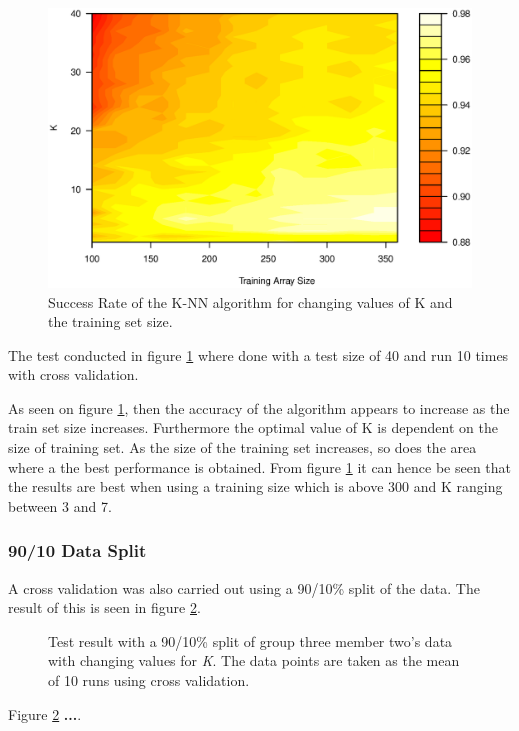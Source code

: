 \begin{figure}[H]
\centering
\includegraphics[width = 15cm]{graphics/graph_G3M2_20}
\caption{Success Rate of the K-NN algorithm for changing values of K and the training set size.}
\label{fig:personDependent_contour}
\end{figure}

The test conducted in figure \ref{fig:personDependent_contour} where done with a test size of 40 and run 10 times with cross validation.

As seen on figure \ref{fig:personDependent_contour}, then the accuracy of the algorithm appears to increase as the train set size increases.
Furthermore the optimal value of K is dependent on the size of training set. 
As the size of the training set increases, so does the area where a the best performance is obtained.
From figure \ref{fig:personDependent_contour} it can hence be seen that the results are best when using a training size which is above 300 and K ranging between 3 and 7.


\subsubsection{90/10 Data Split}
A cross validation was also carried out using a 90/10\% split of the data. 
The result of this is seen in figure \ref{fig:PersonDependent_9010}.


\begin{figure}[H]
\centering
\caption{Test result with a 90/10\% split of group three member two's data with changing values for \textit{K}. The data points are taken as the mean of 10 runs using cross validation.}
\label{fig:PersonDependent_9010}
\end{figure}

Figure \ref{fig:PersonDependent_9010} \textbf{...}.

